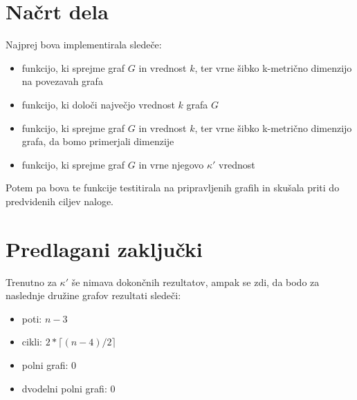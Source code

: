 \documentclass[a4paper,12pt]{article}
\begin{document}
\section{Načrt dela}
Najprej bova implementirala sledeče:
    \begin{itemize}
        \item funkcijo, ki sprejme graf $G$ in vrednost $k$, ter vrne šibko k-metrično dimenzijo na povezavah grafa
        \item funkcijo, ki določi največjo vrednost $k$ grafa $G$
        \item funkcijo, ki sprejme graf $G$ in vrednost $k$, ter vrne šibko k-metrično dimenzijo grafa, da bomo primerjali dimenzije
        \item funkcijo, ki sprejme graf $G$ in vrne njegovo $\kappa'$ vrednost
    \end{itemize}

Potem pa bova te funkcije testitirala na pripravljenih grafih in skušala priti do predvidenih ciljev naloge.

\section{Predlagani zaključki}
Trenutno za $\kappa'$ še nimava dokončnih rezultatov, ampak se zdi, da bodo za naslednje družine grafov 
rezultati sledeči:
    \begin{itemize}
        \item poti: $n-3$
        \item cikli: $2*\lceil (n-4)/2 \rceil$
        \item polni grafi: $0$
        \item dvodelni polni grafi: $0$
    \end{itemize}
\end{document}
